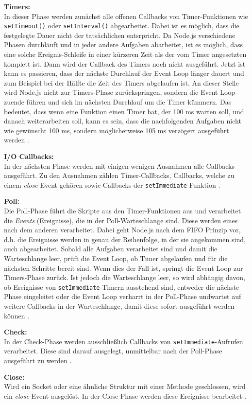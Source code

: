 \textbf{Timers:}\\
In dieser Phase werden zunächst alle offenen Callbacks von Timer-Funktionen wie \texttt{setTimeout()} oder \texttt{setInterval()} abgearbeitet. Dabei ist es möglich, dass die festgelegte Dauer nicht der tatsächlichen entsrpricht. Da Node.js verschiedene Phasen durchläuft und in jeder andere Aufgaben abarbeitet, ist es möglich, dass eine solche Ereignis-Schleife in einer kürzeren Zeit als der vom Timer angesetzten komplett ist. Dann wird der Callback des Timers noch nicht ausgeführt. Jetzt ist kann es passieren, dass der nächste Durchlauf der Event Loop länger dauert und zum Beispiel bei der Hälfte die Zeit des Timers abgelaufen ist. An dieser Stelle wird Node.js nicht zur Timers-Phase zurückspringen, sondern die Event Loop zuende führen und sich im nächsten Durchlauf um die Timer kümmern. Das bedeutet, dass wenn eine Funktion einen Timer hat, der 100 ms warten soll, und danach weiterarbeiten soll, kann es sein, dass die nachfolgenden Aufgaben nicht wie gewünscht 100 ms, sondern möglicherweise 105 ms verzögert ausgeführt werden \cite{njsel}.

\textbf{I/O Callbacks:}\\
In der nächsten Phase werden mit einigen wenigen Ausnahmen alle Callbacks ausgeführt. Zu den Ausnahmen zählen Timer-Callbacks, Callbacks, welche zu einem \textit{close}-Event gehören sowie Callbacks der \texttt{setImmediate}-Funktion \cite{njsel}.

\textbf{Poll:}\\
Die Poll-Phase führt die Skripte aus den Timer-Funktionen aus und verarbeitet die \textit{Events} (Ereignisse), die in der Poll-Warteschlange sind. Diese werden eines nach dem anderen verarbeitet. Dabei geht Node.js nach dem \ac{FIFO} Prinzip vor, d.h. die Ereignisse werden in genau der Reihenfolge, in der sie angekommen sind, auch abgearbeitet. Sobald alle Aufgaben verarbeitet sind und damit die Warteschlange leer, prüft die Event Loop, ob Timer abgelaufen und für die nächsten Schritte bereit sind. Wenn dies der Fall ist, springt die Event Loop zur Timers-Phase zurück. Ist jedoch die Warteschlange leer, so wird abhängig davon, ob Ereignisse von \texttt{setImmediate}-Timern ausstehend sind, entweder die nächste Phase eingeleitet oder die Event Loop verharrt in der Poll-Phase undwartet auf weitere Callbacks in der Warteschlange, damit diese sofort ausgeführt werden können \cite{njsel}.

\textbf{Check:}\\
In der Check-Phase werden ausschließlich Callbacks von \texttt{setImmediate}-Aufrufen verarbeitet. Diese sind darauf ausgelegt, unmittelbar nach der Poll-Phase ausgeführt zu werden \cite{njsel}.

\textbf{Close:}\\
Wird ein Socket oder eine ähnliche Struktur mit einer Methode geschlossen, wird ein \textit{close}-Event ausgelöst. In der Close-Phase werden diese Ereignisse bearbeitet \cite{njsel}.




